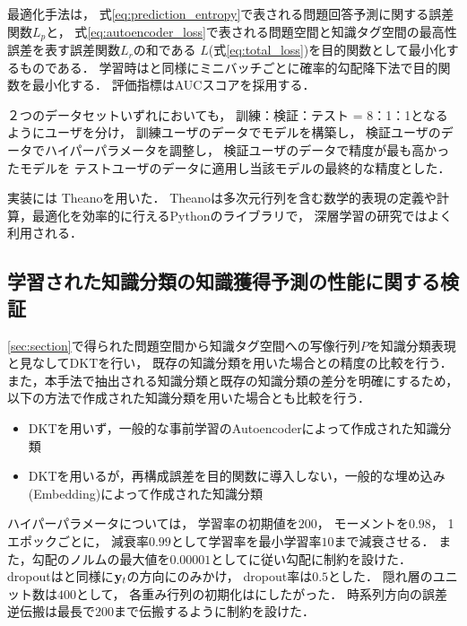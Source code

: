 最適化手法は，
式\ref{eq:prediction_entropy}で表される問題回答予測に関する誤差関数$L_p$と，
式\ref{eq:autoencoder_loss}で表される問題空間と知識タグ空間の最高性誤差を表す誤差関数$L_r$の和である
$L$(式\ref{eq:total_loss})を目的関数として最小化するものである．
学習時は\cite{piech2015deep}と同様にミニバッチごとに確率的勾配降下法で目的関数を最小化する．
評価指標はAUCスコアを採用する．

２つのデータセットいずれにおいても，
訓練：検証：テスト = 8：1：1となるようにユーザを分け，
訓練ユーザのデータでモデルを構築し，
検証ユーザのデータでハイパーパラメータを調整し， 
検証ユーザのデータで精度が最も高かったモデルを
テストユーザのデータに適用し当該モデルの最終的な精度とした．

実装には
Theanoを用いた\cite{bergstra+al:2010-scipy,Bastien-Theano-2012}．
Theanoは多次元行列を含む数学的表現の定義や計算，最適化を効率的に行えるPythonのライブラリで，
深層学習の研究ではよく利用される．


\subsection{学習された知識分類の知識獲得予測の性能に関する検証}

\ref{sec:section}で得られた問題空間から知識タグ空間への写像行列$P$を知識分類表現と見なしてDKTを行い，
既存の知識分類を用いた場合との精度の比較を行う．
また，本手法で抽出される知識分類と既存の知識分類の差分を明確にするため，
以下の方法で作成された知識分類を用いた場合とも比較を行う．
\begin{itemize}
\item DKTを用いず，一般的な事前学習のAutoencoderによって作成された知識分類 \label{c1}
\item DKTを用いるが，再構成誤差を目的関数に導入しない，一般的な埋め込み(Embedding)によって作成された知識分類 \label{c2}
\end{itemize}


ハイパーパラメータについては，
学習率の初期値を$200$，
モーメントを$0.98$，
1エポックごとに，
減衰率$0.99$として学習率を最小学習率$10$まで減衰させる．
また，勾配のノルムの最大値を$0.00001$として\cite{pascanu2013difficulty}に従い勾配に制約を設けた．
dropoutは\cite{piech2015deep}と同様に${\bf y}_t$の方向にのみかけ，
dropout率は$0.5$とした．
隠れ層のユニット数は$400$として，
各重み行列の初期化は\cite{glorot2010understanding}にしたがった．
時系列方向の誤差逆伝搬は最長で$200$まで伝搬するように制約を設けた．

